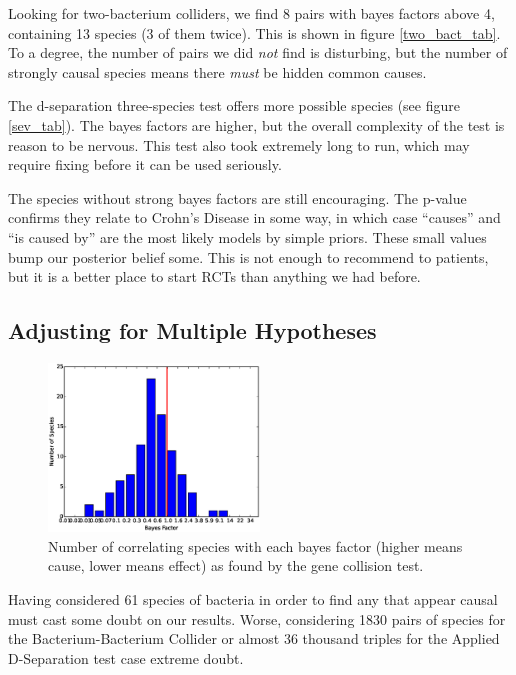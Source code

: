 \documentclass[letterpaper]{article}
\begin{document}
Looking for two-bacterium colliders, we find 8 pairs with bayes
factors above 4, containing 13 species (3 of them twice).  This is
shown in figure \ref{two_bact_tab}.  To a degree, the number of pairs
we did \textit{not} find is disturbing, but the number of strongly
causal species means there \textit{must} be hidden common causes.

The d-separation three-species test offers more possible species (see figure
\ref{sev_tab}).  The bayes factors are higher, but the overall
complexity of the test is reason to be nervous.  This test also took
extremely long to run, which may require fixing before it can be used
seriously.

The species without strong bayes factors are still encouraging.  The
p-value confirms they relate to Crohn's Disease in some way, in which
case ``causes'' and ``is caused by'' are the most likely models by
simple priors.  These small values bump our posterior belief some.
This is not enough to recommend to patients, but it is a better place
to start RCTs than anything we had before.

\subsection{Adjusting for Multiple Hypotheses}

\begin{figure}[b!]
  \includegraphics[width=0.5\textwidth]{histogram}
  \caption{Number of correlating species with each bayes factor
    (higher means cause, lower means effect) as found by the gene
    collision test.}
  \label{hist}
\end{figure}

Having considered 61 species of bacteria in order to find any that
appear causal must cast some doubt on our results.  Worse, considering
1830 pairs of species for the Bacterium-Bacterium Collider or almost
36 thousand triples for the Applied D-Separation test case extreme
doubt.
\end{document}
